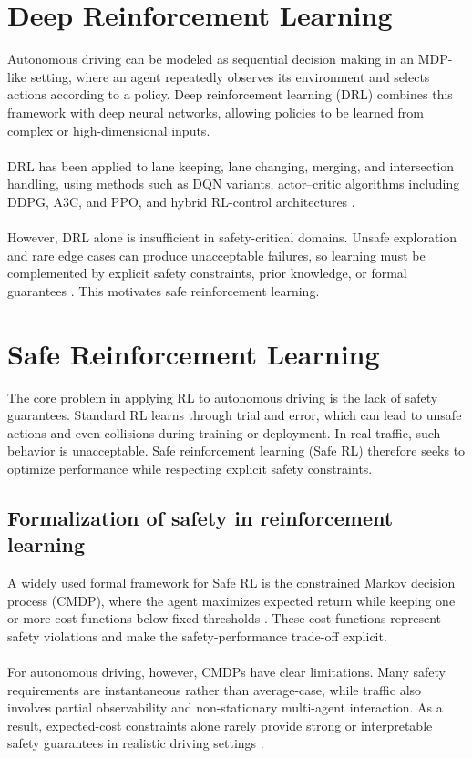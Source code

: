 \section{Deep Reinforcement Learning}

Autonomous driving can be modeled as sequential decision making in an MDP-like setting, where an agent repeatedly observes its environment and selects actions according to a policy. Deep reinforcement learning (DRL) combines this framework with deep neural networks, allowing policies to be learned from complex or high-dimensional inputs.
\\
\\
DRL has been applied to lane keeping, lane changing, merging, and intersection handling, using methods such as DQN variants, actor--critic algorithms including DDPG, A3C, and PPO, and hybrid RL-control architectures \cite{kiran2021deepreinforcementlearningautonomous}.
\\
\\
However, DRL alone is insufficient in safety-critical domains. Unsafe exploration and rare edge cases can produce unacceptable failures, so learning must be complemented by explicit safety constraints, prior knowledge, or formal guarantees \cite{isele2019safereinforcementlearningautonomous}. This motivates safe reinforcement learning.

\section{Safe Reinforcement Learning}

The core problem in applying RL to autonomous driving is the lack of safety guarantees. Standard RL learns through trial and error, which can lead to unsafe actions and even collisions during training or deployment. In real traffic, such behavior is unacceptable. Safe reinforcement learning (Safe RL) therefore seeks to optimize performance while respecting explicit safety constraints.

\subsection{Formalization of safety in reinforcement learning}

A widely used formal framework for Safe RL is the constrained Markov decision process (CMDP), where the agent maximizes expected return while keeping one or more cost functions below fixed thresholds \cite{gu2024reviewsafereinforcementlearning}. These cost functions represent safety violations and make the safety-performance trade-off explicit.
\\
\\
For autonomous driving, however, CMDPs have clear limitations. Many safety requirements are instantaneous rather than average-case, while traffic also involves partial observability and non-stationary multi-agent interaction. As a result, expected-cost constraints alone rarely provide strong or interpretable safety guarantees in realistic driving settings \cite{zhang2024multiagentreinforcementlearningautonomous}.

